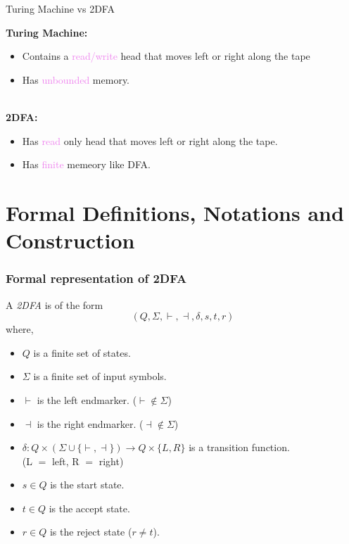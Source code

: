 \documentclass{beamer}
\begin{document}
\begin{frame}{Turing Machine vs 2DFA}
  
    \textbf{Turing Machine:}
    \begin{itemize}
      \item Contains a \textcolor{violet}{read/write} head that moves left or right along the tape 
      \item Has \textcolor{violet}{unbounded} memory.
    \end{itemize}
    \hspace*{1cm}\\
    \textbf{2DFA:}
    \begin{itemize}
      \item Has  \textcolor{violet}{read} only head that moves left or right along the tape.
      \item Has \textcolor{violet}{finite} memeory like DFA.
    \end{itemize}
  
\end{frame}

\section{Formal Definitions, Notations and Construction}

\begin{frame}
\frametitle{Formal representation of 2DFA}

A \emph{2DFA} is of the form 
\textbf{\[(Q, \Sigma, \vdash, \dashv, \delta, s, t, r)\]}
where,
\begin{itemize}
\item $Q$ is a finite set of states.
\item $\Sigma$ is a finite set of input symbols.
\item $\vdash$ is the left endmarker. ($\vdash \notin \Sigma$)
\item $\dashv$ is the right endmarker. ($\dashv \notin \Sigma$)
\item $\delta : Q \times (\Sigma \cup \{\vdash, \dashv\}) \rightarrow Q \times \{L, R\}$ is a transition function. \\(L $=$ left, R $=$ right)
\item $s \in Q$ is the start state.
\item $t \in Q$ is the accept state.
\item $r \in Q$ is the reject state ($r \neq t$).
\end{itemize}
\end{frame}
\end{document}
